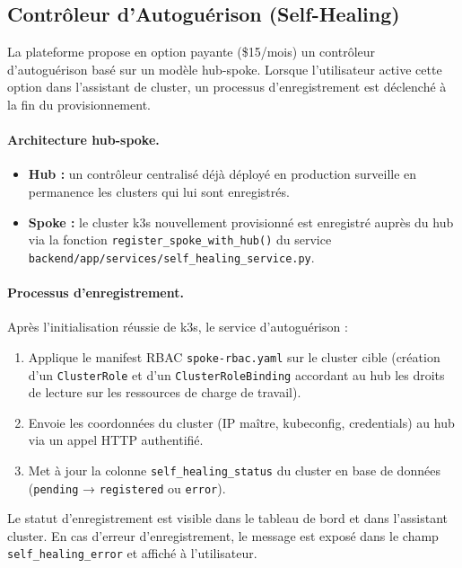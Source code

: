 \subsection{Contrôleur d'Autoguérison (Self-Healing)}

La plateforme propose en option payante (\$15/mois) un contrôleur d'autoguérison
basé sur un modèle hub-spoke. Lorsque l'utilisateur active cette option dans
l'assistant de cluster, un processus d'enregistrement est déclenché à la fin du
provisionnement.

\paragraph{Architecture hub-spoke.}
\begin{itemize}
  \item \textbf{Hub :} un contrôleur centralisé déjà déployé en production
        surveille en permanence les clusters qui lui sont enregistrés.
  \item \textbf{Spoke :} le cluster k3s nouvellement provisionné est enregistré
        auprès du hub via la fonction \texttt{register\_spoke\_with\_hub()} du
        service \texttt{backend/app/services/self\_healing\_service.py}.
\end{itemize}

\paragraph{Processus d'enregistrement.}
Après l'initialisation réussie de k3s, le service d'autoguérison :
\begin{enumerate}
  \item Applique le manifest RBAC \texttt{spoke-rbac.yaml} sur le cluster cible
        (création d'un \texttt{ClusterRole} et d'un \texttt{ClusterRoleBinding}
        accordant au hub les droits de lecture sur les ressources de charge de travail).
  \item Envoie les coordonnées du cluster (IP maître, kubeconfig, credentials)
        au hub via un appel HTTP authentifié.
  \item Met à jour la colonne \texttt{self\_healing\_status} du cluster en base
        de données (\texttt{pending} → \texttt{registered} ou \texttt{error}).
\end{enumerate}

Le statut d'enregistrement est visible dans le tableau de bord et dans l'assistant
cluster. En cas d'erreur d'enregistrement, le message est exposé dans le champ
\texttt{self\_healing\_error} et affiché à l'utilisateur.

